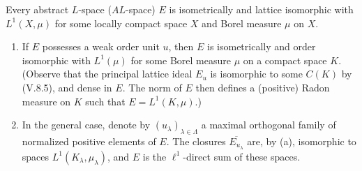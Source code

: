 Every abstract $L$-space ($AL$-space) $E$ is isometrically and lattice isomorphic with $L^1(X, \mu)$ for some locally compact space $X$ and Borel measure $\mu$ on $X$.

\begin{enumerate}
\item[(a)] If $E$ possesses a weak order unit $u$, then $E$ is isometrically and order isomorphic with $L^1(\mu)$ for some Borel measure $\mu$ on a compact space $K$. (Observe that the principal lattice ideal $E_u$ is isomorphic to some $C(K)$ by (V.8.5), and dense in $E$. The norm of $E$ then defines a (positive) Radon measure on $K$ such that $E = L^1(K, \mu)$.)

\item[(b)] In the general case, denote by $(u_\lambda)_{\lambda \in \Lambda}$ a maximal orthogonal family of normalized positive elements of $E$. The closures $\overline{E_{u_\lambda}}$ are, by (a), isomorphic to spaces $L^1(K_\lambda, \mu_\lambda)$, and $E$ is the $\ell^1$-direct sum of these spaces.
\end{enumerate}
